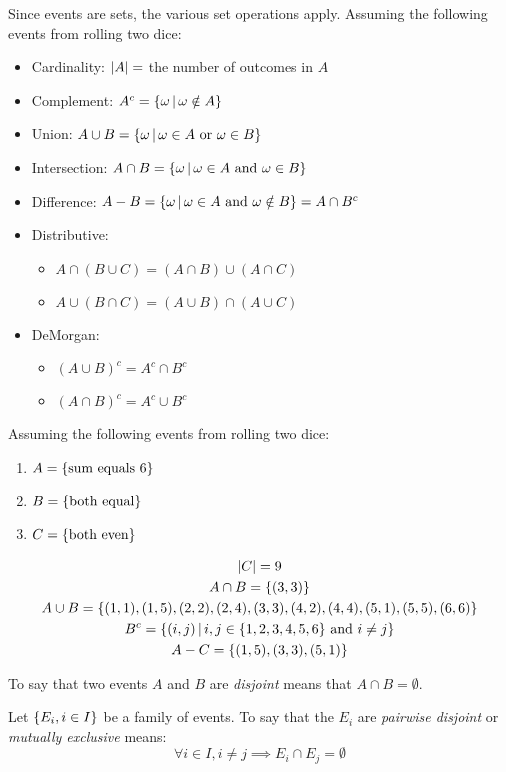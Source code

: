 \documentclass[letterpaper,12pt,fleqn]{article}
\newcommand{\w}{\omega}
\begin{document}
Since events are sets, the various set operations apply.  Assuming the following events from rolling two dice:
\begin{itemize}
\item Cardinality: \(\lvert A\rvert=\) the number of outcomes in \(A\)
\item Complement: \(A^c=\setb{\w}{\w\notin A}\)
\item Union: \(A\cup B=\setb{\w}{\w\in A\ \text{or}\ \w\in B}\)
\item Intersection: \(A\cap B=\setb{\w}{\w\in A\ \text{and}\ \w\in B}\)
\item Difference: \(A-B=\setb{\w}{\w\in A\ \text{and}\ \w\notin B}=A\cap B^c\)
\item Distributive:
  \begin{itemize}
  \item \(A\cap(B\cup C)=(A\cap B)\cup(A\cap C)\)
  \item \(A\cup(B\cap C)=(A\cup B)\cap(A\cup C)\)
  \end{itemize}
\item DeMorgan:
  \begin{itemize}
  \item \((A\cup B)^c=A^c\cap B^c\)
  \item \((A\cap B)^c=A^c\cup B^c\)
  \end{itemize}
\end{itemize}

\begin{example}
  Assuming the following events from rolling two dice:
  \begin{enumerate}
  \item \(A=\{\text{sum equals 6}\}\)
  \item \(B=\{\text{both equal}\}\)
  \item \(C=\{\text{both even}\}\)
  \end{enumerate}
  \begin{gather*}
    \lvert C\rvert=9 \\
    A\cap B=\{(3,3)\} \\
    A\cup B=\{(1,1),(1,5),(2,2),(2,4),(3,3),(4,2),(4,4),(5,1),(5,5),(6,6)\} \\
    B^c=\left\{{(i,j)}\,\middle|\,{i,j\in\{1,2,3,4,5,6\}\ \text{and}\ i\ne j}\right\} \\
    A-C=\{(1,5),(3,3),(5,1)\}
  \end{gather*}
\end{example}

\begin{definition}[Disjoint]
  To say that two events \(A\) and \(B\) are \emph{disjoint} means that \(A\cap B=\emptyset\).

  Let \(\{E_i,i\in I\}\) be a family of events.  To say that the \(E_i\) are \emph{pairwise disjoint} or
  \emph{mutually exclusive} means:
  \[\forall i\in I,i\ne j\implies E_i\cap E_j=\emptyset\]
\end{definition}
\end{document}
